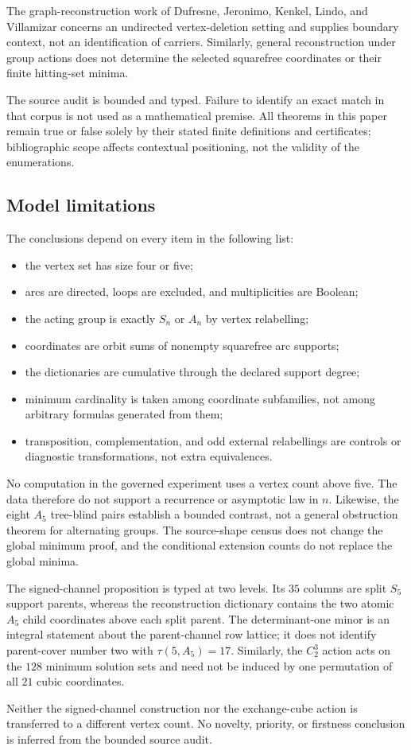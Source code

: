 The graph-reconstruction work of Dufresne, Jeronimo, Kenkel, Lindo, and
Villamizar \cite{DufresneEtAl2026} concerns an undirected vertex-deletion
setting and supplies boundary context, not an identification of carriers.
Similarly, general reconstruction under group actions
\cite{RadcliffeScott2006} does not determine the selected squarefree
coordinates or their finite hitting-set minima.

The source audit is bounded and typed.  Failure to identify an exact match in
that corpus is not used as a mathematical premise.  All theorems in this paper
remain true or false solely by their stated finite definitions and
certificates; bibliographic scope affects contextual positioning, not the
validity of the enumerations.

\subsection{Model limitations}

The conclusions depend on every item in the following list:
\begin{itemize}
  \item the vertex set has size four or five;
  \item arcs are directed, loops are excluded, and multiplicities are Boolean;
  \item the acting group is exactly $S_n$ or $A_n$ by vertex relabelling;
  \item coordinates are orbit sums of nonempty squarefree arc supports;
  \item the dictionaries are cumulative through the declared support degree;
  \item minimum cardinality is taken among coordinate subfamilies, not among
  arbitrary formulas generated from them;
  \item transposition, complementation, and odd external relabellings are
  controls or diagnostic transformations, not extra equivalences.
\end{itemize}

No computation in the governed experiment uses a vertex count above five.
The data therefore do not support a recurrence or asymptotic law in $n$.
Likewise, the eight $A_5$ tree-blind pairs establish a bounded contrast, not a
general obstruction theorem for alternating groups.  The source-shape census
does not change the global minimum proof, and the conditional extension
counts do not replace the global minima.

The signed-channel proposition is typed at two levels.  Its $35$ columns are
split $S_5$ support parents, whereas the reconstruction dictionary contains
the two atomic $A_5$ child coordinates above each split parent.  The
determinant-one minor is an integral statement about the parent-channel row
lattice; it does not identify parent-cover number two with
$\tau(5,A_5)=17$.  Similarly, the $C_2^3$ action acts on the $128$ minimum
solution sets and need not be induced by one permutation of all $21$ cubic
coordinates.

Neither the signed-channel construction nor the exchange-cube action is
transferred to a different vertex count.  No novelty, priority, or firstness
conclusion is inferred from the bounded source audit.
